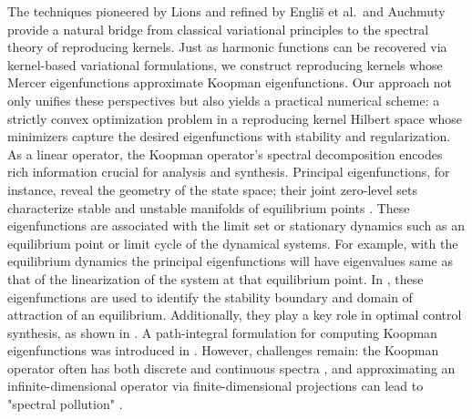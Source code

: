\documentclass[11pt]{article}
\theoremstyle{plain}
\begin{document}
The techniques pioneered by Lions and refined by Engli\v{s}
 et al.\ and Auchmuty provide a natural bridge from classical variational principles to the spectral theory of reproducing kernels. Just as harmonic functions can be recovered via kernel-based variational formulations, we construct reproducing kernels whose Mercer eigenfunctions approximate Koopman eigenfunctions. Our approach not only unifies these perspectives but also yields a practical numerical scheme: a strictly convex optimization problem in a reproducing kernel Hilbert space whose minimizers capture the desired eigenfunctions with stability and regularization. As a linear operator, the Koopman operator's spectral decomposition encodes rich information crucial for analysis and synthesis. Principal eigenfunctions, for instance, reveal the geometry of the state space; their joint zero-level sets characterize stable and unstable manifolds of equilibrium points \cite{mezic2005spectral}. These eigenfunctions are associated with the limit set or stationary dynamics such as an equilibrium point or limit cycle of the dynamical systems. For example, with the equilibrium dynamics the principal eigenfunctions will have eigenvalues same as that of the linearization of the system at that equilibrium point.  In \cite{mauroy2016global,umathe2023spectral,matavalam2024data}, these eigenfunctions are used to identify the stability boundary and domain of attraction of an equilibrium. Additionally, they play a key role in optimal control synthesis, as shown in \cite{vaidya2022spectral,VaidyaKHJ2024}. A path-integral formulation for computing Koopman eigenfunctions was introduced in \cite{deka2023path}. However, challenges remain: the Koopman operator often has both discrete and continuous spectra \cite{mezic2005spectral}, and approximating an infinite-dimensional operator via finite-dimensional projections can lead to "spectral pollution" \cite{colbrook2020foundations}.
\end{document}
